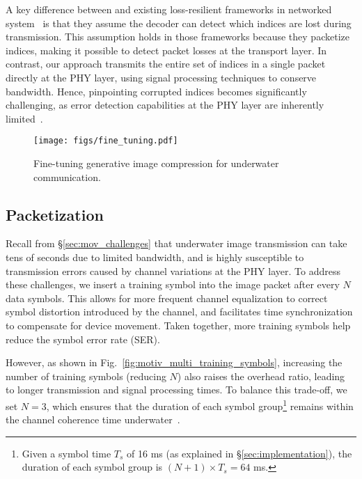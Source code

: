 A key difference between \sysname and existing loss-resilient frameworks in networked system~\cite{nsdi24_grace,li2024reparolossresilientgenerativecodec} is that they assume the decoder can detect which indices are lost during transmission. This assumption holds in those frameworks because they packetize indices, making it possible to detect packet losses at the transport layer. In contrast, our approach transmits the entire set of indices in a single packet directly at the PHY layer, using signal processing techniques to conserve bandwidth. Hence, pinpointing corrupted indices becomes significantly challenging, as error detection capabilities at the PHY layer are inherently limited~\cite{hamming1986coding}.


\begin{figure}[t]
    \centering
    \texttt{[image: figs/fine\_tuning.pdf]}
    \caption{Fine-tuning generative image compression for underwater communication.}
    \label{fig:fine_tuning}
\end{figure}


\subsection{Packetization}
\label{sec:packetizer}



Recall from \S\ref{sec:mov_challenges} that underwater image transmission
can take tens of seconds due to limited bandwidth,
and is highly susceptible to transmission errors caused by channel variations at the PHY layer.
To address these challenges, we insert a training symbol into the image packet
after every $N$ data symbols. This allows for more frequent channel
equalization
to correct symbol distortion introduced by the channel, and facilitates
time synchronization to compensate for device movement.
Taken together, more training symbols help reduce the symbol error rate (SER).







However, as shown in Fig.~\ref{fig:motiv_multi_training_symbols},
increasing the number of training symbols (\ie reducing $N$)
also raises the overhead ratio, leading to longer transmission
and signal processing times.
To balance this trade-off, we set $N=3$, which ensures that
the duration of each symbol group\footnote{Given a symbol time
$T_{s}$ of 16 ms (as explained in \S\ref{sec:implementation}), the duration
of each symbol group is $(N+1) \times T_{s}  = 64$ ms.}
remains within the channel coherence time underwater~\cite{yang2012properties}.


